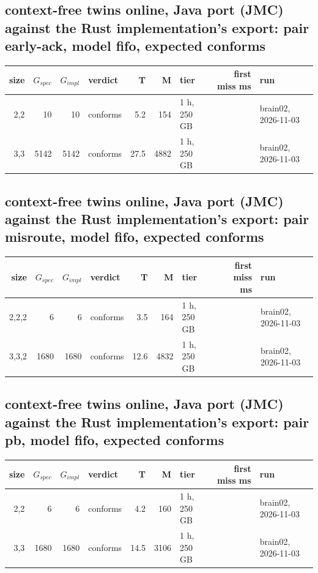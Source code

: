 \documentclass[10pt]{article}
\begin{document}
\subsection*{context-free twins online, Java port (JMC) against the Rust implementation's export: pair \textsf{early-ack}, model fifo, expected conforms}
\begin{longtable}{@{}rrrlrrlrl@{}}
\toprule
size & $G_{\mathit{spec}}$ & $G_{\mathit{impl}}$ & verdict & T & M & tier & first miss ms & run \\
\midrule
\endhead
\color{blue} 2,2 & 10 & 10 & conforms & 5.2 & 154 & 1 h, 250 GB &  & brain02, 2026-11-03 \\
\color{blue} 3,3 & 5142 & 5142 & conforms & 27.5 & 4882 & 1 h, 250 GB &  & brain02, 2026-11-03 \\
\bottomrule
\end{longtable}
\subsection*{context-free twins online, Java port (JMC) against the Rust implementation's export: pair \textsf{misroute}, model fifo, expected conforms}
\begin{longtable}{@{}rrrlrrlrl@{}}
\toprule
size & $G_{\mathit{spec}}$ & $G_{\mathit{impl}}$ & verdict & T & M & tier & first miss ms & run \\
\midrule
\endhead
\color{red} 2,2,2 & 6 & 6 & conforms & 3.5 & 164 & 1 h, 250 GB &  & brain02, 2026-11-03 \\
\color{red} 3,3,2 & 1680 & 1680 & conforms & 12.6 & 4832 & 1 h, 250 GB &  & brain02, 2026-11-03 \\
\bottomrule
\end{longtable}
\subsection*{context-free twins online, Java port (JMC) against the Rust implementation's export: pair \textsf{pb}, model fifo, expected conforms}
\begin{longtable}{@{}rrrlrrlrl@{}}
\toprule
size & $G_{\mathit{spec}}$ & $G_{\mathit{impl}}$ & verdict & T & M & tier & first miss ms & run \\
\midrule
\endhead
\color{blue} 2,2 & 6 & 6 & conforms & 4.2 & 160 & 1 h, 250 GB &  & brain02, 2026-11-03 \\
\color{blue} 3,3 & 1680 & 1680 & conforms & 14.5 & 3106 & 1 h, 250 GB &  & brain02, 2026-11-03 \\
\bottomrule
\end{longtable}
\end{document}
